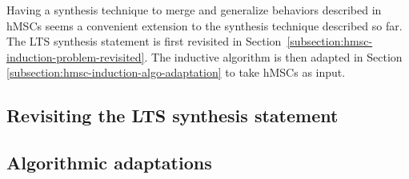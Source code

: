 Having a synthesis technique to merge and generalize behaviors described in hMSCs seems a convenient extension to the synthesis technique described so far. The LTS synthesis statement is first revisited in Section~\ref{subsection:hmsc-induction-problem-revisited}. The inductive algorithm is then adapted in Section \ref{subsection:hmsc-induction-algo-adaptation} to take hMSCs as input.

\subsection{Revisiting the LTS synthesis statement\label{subsection:hmsc-induction-problem-revisited}}



\subsection{Algorithmic adaptations\label{subsection:hmsc-induction-algo-adaptation}}

